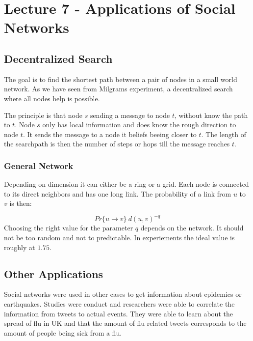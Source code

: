 \section{Lecture 7 - Applications of Social Networks} %
\label{sec:lecture_7_applications_of_social_networks}

\subsection{Decentralized Search} %
\label{sub:decentralized_search}
The goal is to find the shortest path between a pair of nodes in a small world network.
As we have seen from Milgrams experiment,
a decentralized search where all nodes help is possible.

The principle is that node $s$ sending a message to node $t$,
without know the path to $t$.
Node $s$ only has local information
and does know the rough direction to node $t$.
It sends the message to a node it beliefs beeing closer to $t$.
The length of the searchpath is then the number of steps or hops till the message reaches $t$.

\subsubsection{General Network} %
\label{ssub:general_network}
	Depending on dimension it can either be a  ring or a grid.
	Each node is connected to its direct neighbors
	and has one long link.
	The probability of a link from $u$ to $v$ is then:
	
	\begin{equation}
		Pr\{u \rightarrow v\} ~ d(u, v)^{-q}
	\end{equation}
	Choosing the right value for the parameter $q$ depends on the network.
	It should not be too random and not to predictable.
	In experiements the ideal value is roughly at $1.75$.

\subsection{Other Applications} %
\label{sub:other_applications}
Social networks were used in other cases to get information about epidemics or earthquakes.
Studies were conduct
and researchers were able to correlate the information from tweets to actual events.
They were able to learn about the spread of flu in UK
and that the amount of flu related tweets corresponds to the amount of people being sick from a flu.

